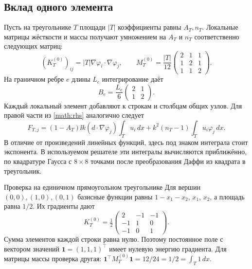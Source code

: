 \subsection{Вклад одного элемента}
Пусть на треугольнике $T$ площади $|T|$ коэффициенты равны $A_T,n_T$.
Локальные матрицы жёсткости и массы получают умножением на $A_T$ и $n_T$
соответственно следующих матриц:
\begin{equation}
 (K_T^{(0)})_{ij}=|T|\nabla\varphi_i\cdot\nabla\varphi_j,\qquad
 M_T^{(0)}=\frac{|T|}{12}
 \begin{pmatrix}2&1&1\\1&2&1\\1&1&2\end{pmatrix}.\label{math:local-mass}
\end{equation}
На граничном ребре $e$ длины $L_e$ интегрирование даёт
\begin{equation}
 B_e=\frac{L_e}{6}\begin{pmatrix}2&1\\1&2\end{pmatrix}.\label{math:edge-mass}
\end{equation}
Каждый локальный элемент добавляют к строкам и столбцам общих узлов.
Для правой части из \eqref{math:rhs} аналогично следует
\begin{equation}
 F_{T,j}=(1-A_T)\ii k(d\cdot\nabla\varphi_j)\int_T u_i\,dx
              + k^2(n_T-1)\int_Tu_i\varphi_j\,dx.\label{math:local-rhs}
\end{equation}
В отличие от произведений линейных функций, здесь под знаком интеграла
стоит экспонента. В используемом решателе эти интегралы вычисляются
приближённо, по квадратуре Гаусса с $8\times8$ точками после
преобразования Даффи из квадрата в треугольник.

\begin{worked}{Проверка на единичном прямоугольном треугольнике}
Для вершин $(0,0),(1,0),(0,1)$ базисные функции равны $1-x_1-x_2$, $x_1$,
$x_2$, а площадь равна $1/2$. Их градиенты дают
\[
 K_T^{(0)}=\tfrac12\begin{pmatrix}2&-1&-1\\-1&1&0\\-1&0&1\end{pmatrix}.
\]
Сумма элементов каждой строки равна нулю. Поэтому постоянное поле с
вектором значений $\bm1=(1,1,1)^\top$ имеет нулевую энергию градиента.
Для матрицы массы проверка другая:
$\bm1^\top M_T^{(0)}\bm1=12/24=1/2=\int_T1\,dx$.
\end{worked}

